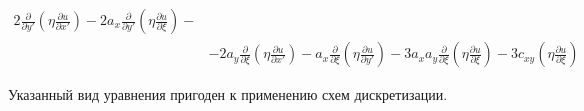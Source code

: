 \begin{equation*}
\begin{split}
        2
        \frac
            {\partial }
            {\partial y'}
        \left(
            \eta
            \frac
                {\partial u}
                {\partial x'}
        \right)
        -
        2
        a_x
        \frac
            {\partial }
            {\partial y'}
        \left(
            \eta
            \frac
                {\partial u}
                {\partial \xi}
        \right)
        -
        \\
        &
        -
        2
        a_y
        \frac
            {\partial }
            {\partial \xi}
        \left(
            \eta
            \frac
                {\partial u}
                {\partial x'}
        \right)
        -
        a_x
        \frac
            {\partial }
            {\partial \xi}
        \left(
            \eta
            \frac
                {\partial u}
                {\partial y'}
        \right)
        -
        3
        a_x
        a_y
        \frac
            {\partial }
            {\partial \xi}
        \left(
            \eta
            \frac
                {\partial u}
                {\partial \xi}
        \right)
        -
        3
        c_{xy}
        \left(
            \eta
            \frac
                {\partial u}
                {\partial \xi}
        \right)
    \end{split}
\end{equation*}

Указанный вид уравнения пригоден к применению схем дискретизации.
